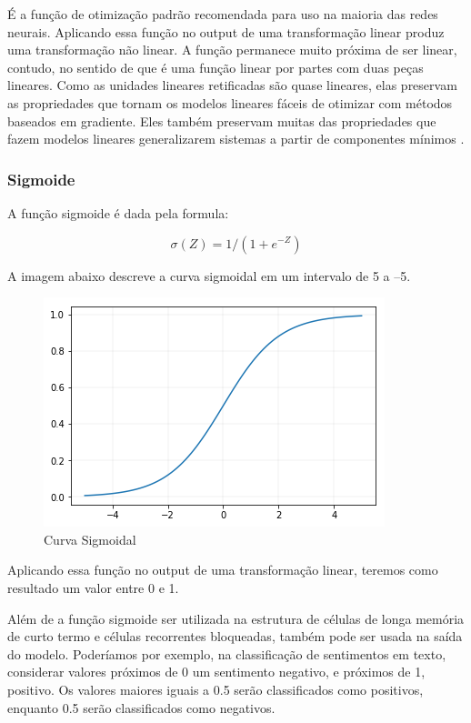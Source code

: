 \documentclass[12pt]{article}
\begin{document}
É a função de otimização padrão recomendada para uso na maioria das redes neurais. Aplicando essa função no output de uma transformação linear produz uma transformação não linear. A função permanece muito próxima de ser linear, contudo, no sentido de que é uma função linear por partes com duas peças lineares. Como as unidades lineares retificadas são quase lineares, elas preservam as propriedades que tornam os modelos lineares fáceis de otimizar com métodos baseados em gradiente. Eles também preservam muitas das propriedades que fazem modelos lineares generalizarem sistemas a partir de componentes mínimos \cite{Goodfellow-et-al-2016}.

\subsubsection{Sigmoide}

A função sigmoide é dada pela formula:

\begin{equation}
    \sigma(Z) = 1/(1+e^{-Z})
\end{equation}

A imagem abaixo descreve a curva sigmoidal em um intervalo de 5 a –5.

\begin{figure}[ht]
\centering
\includegraphics[width=.5\textwidth]{images/sigmoid.png}
\caption{Curva Sigmoidal}
\label{fig:sigmoid}
\end{figure}

Aplicando essa função no output de uma transformação linear, teremos como resultado um valor entre 0 e 1.

Além de a função sigmoide ser utilizada na estrutura de células de longa memória de curto termo e células recorrentes bloqueadas, também pode ser usada na saída do modelo. Poderíamos por exemplo, na classificação de sentimentos em texto, considerar valores próximos de 0 um sentimento negativo, e próximos de 1, positivo. Os valores maiores iguais a 0.5 serão classificados como positivos, enquanto 0.5 serão classificados como negativos.
\end{document}
